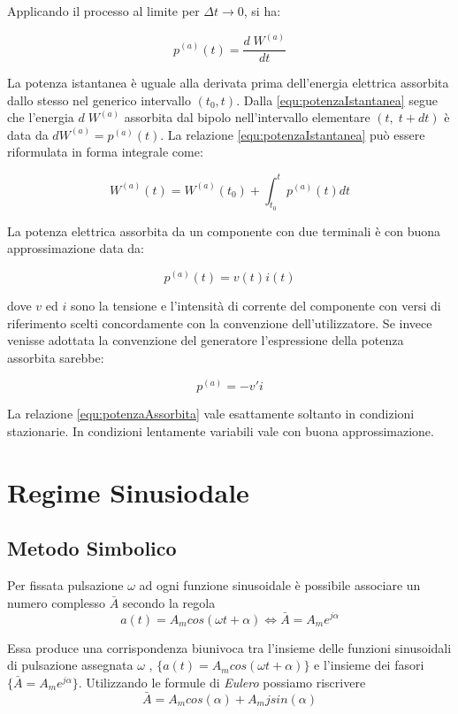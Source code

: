 \documentclass[a4paper]{report}
\begin{document}
Applicando il processo al limite per $\Delta t \rightarrow 0$, si ha:

\begin{equation}\label{equ:potenzaIstantanea}
p^{(a)}(t)=\dfrac{d\;W^{(a)}}{dt}
\end{equation}

La potenza istantanea \`e uguale alla derivata prima dell'energia
elettrica assorbita dallo stesso nel generico intervallo 
$(t_0,t)$. Dalla \ref{equ:potenzaIstantanea} segue che l'energia $d\;
W^{(a)}$ assorbita dal bipolo nell'intervallo elementare $(t,\;
t+dt)$ \`e data da $dW^{(a)}=p^{(a)}(t)$. La relazione
\ref{equ:potenzaIstantanea} pu\`o essere riformulata in forma integrale come:

\[
W^{(a)}(t)=W^{(a)}(t_0)+\int_{t_0}^{t}p^{(a)}(t)dt
\]

La potenza elettrica assorbita da un componente con due terminali \`e
con buona approssimazione data da:

\begin{equation}\label{equ:potenzaAssorbita}
p^{(a)}(t)=v(t)i(t)
\end{equation}

dove $v$ ed $i$ sono la tensione e l'intensit\`a di corrente del
componente con versi di riferimento scelti concordamente con la
convenzione dell'utilizzatore. Se invece venisse adottata la
convenzione del generatore l'espressione della potenza assorbita
sarebbe:

\[
p^{(a)}=-v'i
\]

La relazione \ref{equ:potenzaAssorbita} vale esattamente soltanto in
condizioni stazionarie. In condizioni lentamente variabili vale con
buona approssimazione.

\chapter{Regime Sinusiodale}
\section{Metodo Simbolico}
Per fissata pulsazione $\omega$ ad ogni funzione sinusoidale \`e
possibile associare un numero complesso $\bar{A}$ secondo la regola
\[
a(t) = A_mcos(\omega t+\alpha)\iff \bar{A} = A_me^{j\alpha}
\]

Essa produce una corrispondenza biunivoca tra l'insieme delle funzioni
sinusoidali di pulsazione assegnata $\omega$ , $\{
a(t)=A_mcos(\omega t+\alpha )\}$ e l'insieme dei fasori $\{ \bar{A} =
A_me^{j\alpha} \}$.
Utilizzando le formule di \emph{Eulero} possiamo riscrivere
\[
\bar{A} = A_mcos(\alpha)+ A_mjsin(\alpha)
\]
\end{document}
